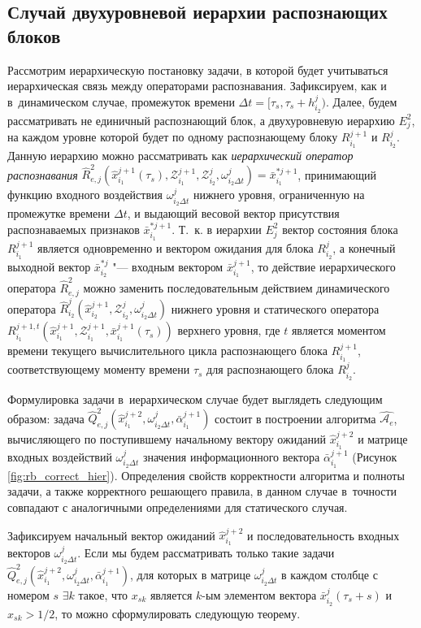 \documentclass[a4paper, 12pt]{article}
\theoremstyle{plain}
\begin{document}
	\subsection{Случай двухуровневой иерархии распознающих блоков}
	Рассмотрим иерархическую постановку задачи, в которой будет учитываться иерархическая связь между операторами распознавания. Зафиксируем, как и в~динамическом случае, промежуток времени $\Delta t=[\tau_s,\tau_s+h_{i_2}^j)$. Далее, будем рассматривать не единичный распознающий блок, а двухуровневую иерархию $E_j^2$, на каждом уровне которой будет по одному распознающему блоку $R_{i_1}^{j+1}$ и $R_{i_2}^j$. Данную иерархию можно рассматривать как \textit{иерархический оператор распознавания} $\hat R_{e,j}^2(\hat x_{i_1}^{j+1}(\tau_s),\mathcal Z_{i_1}^{j+1},\mathcal Z_{i_2}^j,\omega_{i_2\Delta t}^j)=\bar x_{i_1}^{*j+1}$, принимающий функцию входного воздействия $\omega_{i_2\Delta t}^j$ нижнего уровня, ограниченную на промежутке времени $\Delta t$, и выдающий весовой вектор присутствия распознаваемых признаков $\bar x_{i_1}^{*j+1}$. Т.~к. в иерархии $E_j^2$ вектор состояния блока $R_{i_1}^{j+1}$ является одновременно и вектором ожидания для блока $R_{i_2}^j$, а конечный выходной вектор $\bar x_{i_2}^{*j}$ "--- входным вектором $\bar x_{i_1}^{j+1}$, то действие иерархического оператора $\hat R_{e,j}^2$ можно заменить последовательным действием динамического оператора $\hat R_{i_2}^j(\hat x _{i_2}^{j+1},\mathcal Z_{i_2}^j,\omega_{i_2\Delta t}^j)$ нижнего уровня и статического оператора $R_{i_1}^{j+1,t}(\hat x _{i_1}^{j+1},\mathcal Z_{i_1}^{j+1},\bar x_{i_1}^{j+1}(\tau_s))$ верхнего уровня, где $t$ является моментом времени текущего вычислительного цикла распознающего блока $R_{i_1}^{j+1}$, соответствующему моменту времени $\tau_s$ для распознающего блока $R_{i_2}^j$.
	
	Формулировка задачи в~иерархическом случае будет выглядеть следующим образом: задача $\hat Q_{e,j}^2(\hat x_{i_1}^{j+2},\omega_{i_2\Delta t}^j,\bar\alpha_{i_1}^{j+1})$ состоит в построении алгоритма $\hat{\mathcal A_e}$, вычисляющего по поступившему начальному вектору ожиданий $\hat x_{i_1}^{j+2}$ и матрице входных воздействий $\omega_{i_2\Delta t}^j$ значения информационного вектора $\bar\alpha_{i_1}^{j+1}$ (Рисунок \ref{fig:rb_correct_hier}). Определения свойств корректности алгоритма и полноты задачи, а также корректного решающего правила, в данном случае в~точности совпадают с аналогичными определениями для статического случая.
	
	Зафиксируем начальный вектор ожиданий $\hat x_{i_1}^{j+2}$ и последовательность входных векторов $\omega_{i_2\Delta{t}}^j$. Если мы будем рассматривать только такие задачи $\hat Q_{e,j}^2(\hat x_{i_1}^{j+2},\omega_{i_2\Delta{t}}^j,\bar\alpha_{i_1}^{j+1})$, для которых в матрице $\omega_{i_2\Delta{t}}^j$ в каждом столбце с номером $s$ ${\exists}k$ такое, что $x_{sk}$ является $k$-ым элементом вектора $\bar x_{i_2}^j(\tau_s+s)$ и $x_{sk}>1/2$, то можно сформулировать следующую теорему.
		
\end{document}
